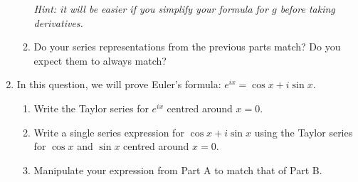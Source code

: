 \begin{enumerate}
\begin{enumerate}
        \emph{Hint: it will be easier if you simplify your formula for $g$ before taking derivatives.}
        \item Do your series representations from the previous parts match? Do you expect them to always match?
    \end{enumerate}

	\item In this question, we will prove Euler's formula: $e^{ix} = \cos{x} + i\sin{x}$.
    \begin{enumerate}
        \item Write the Taylor series for $e^{ix}$ centred around $x=0$.
        \item Write a single series expression for $\cos{x} + i\sin{x}$ using the Taylor series for $\cos{x}$ and $\sin{x}$ centred around $x=0$.
        \item Manipulate your expression from Part A to match that of Part B.
    \end{enumerate}

\begin{comment}

    e^-x prove that for fixed x, it converges 
Do another with ratio test, finite ratio; for a fixed x, will it converge?
Show x^n/n! works for |x| < 1 

Start with sum of x^n, then find partial sums, bound them, show if |x|<1, it converges
Then consider e^x = sum x^n/n!, do comparison if |x|<1
Then do ratio test with e^x to find which x does this work for
Ratio test for Taylor series for ln(1+x)

    
    \item The angle $\Theta$ in radians of a robotic arm measured from the horizontal axis is known:

    \[\Theta(t) = \omega t - t^2 + R_2(t) \]

    Where $R_2(t)$ is an unknown error term with $|R_2(t)| \leq \dfrac{1}{10}t^3$, and $\omega$ is the angular velocity of the arm. 
    \begin{enumerate}

        \item Write down and simplify the expression for $\Theta^2$. Collect the constant, linear, and quadratic terms together, and leave the rest of the terms at the end. 

        
        \item If the length of the arm is $10$ metres, the vertical position of the end is $y(t) = 10 \sin(\Theta(t))$. Using the estimate $\sin(x) = x + R(x)$, where $R(x) \leq \dfrac{x^2}{2}$, find the second order Taylor polynomial for $y(t)$.
        
        \item  The remainder for part $b)$ is $R(\Theta(t)) + R_2(t)$. Find a bound on this error term.  

        \item Find a value of $\omega$ to make sure the robot arm catches a ball within a certain time

        
    \end{enumerate}
		
\end{comment}
\end{enumerate}
